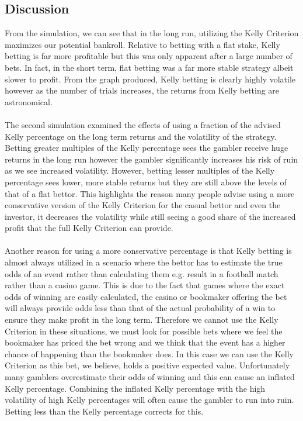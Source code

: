 \documentclass[12pt]{article}
\begin{document}
\subsection{Discussion}
From the simulation, we can see that in the long run, utilizing the Kelly Criterion maximizes our potential bankroll. Relative to betting with a flat stake, Kelly betting is far more profitable but this was only apparent after a large number of bets. In fact, in the short term, flat betting was a far more stable strategy albeit slower to profit. From the graph produced, Kelly betting is clearly highly volatile however as the number of trials increases, the returns from Kelly betting are astronomical.
\\\\
The second simulation examined the effects of using a fraction of the advised Kelly percentage on the long term returns and the volatility of the strategy. Betting greater multiples of the Kelly percentage sees the gambler receive huge returns in the long run however the gambler significantly increases his risk of ruin as we see increased volatility. However, betting lesser multiples of the Kelly percentage sees lower, more stable returns but they are still above the levels of that of a flat bettor. This highlights the reason many people advise using a more conservative version of the Kelly Criterion for the casual bettor and even the investor, it decreases the volatility while still seeing a good share of the increased profit that the full Kelly Criterion can provide.
\\\\
Another reason for using a more conservative percentage is that Kelly betting is almost always utilized in a scenario where the bettor has to estimate the true odds of an event rather than calculating them e.g. result in a football match rather than a casino game. This is due to the fact that games where the exact odds of winning are easily calculated, the casino or bookmaker offering the bet will always provide odds less than that of the actual probability of a win to ensure they make profit in the long term. Therefore we cannot use the Kelly Criterion in these situations, we must look for possible bets where we feel the bookmaker has priced the bet wrong and we think that the event has a higher chance of happening than the bookmaker does. In this case we can use the Kelly Criterion as this bet, we believe, holds a positive expected value. Unfortunately many gamblers overestimate their odds of winning and this can cause an inflated Kelly percentage. Combining the inflated Kelly percentage with the high volatility of high Kelly percentages will often cause the gambler to run into ruin. Betting less than the Kelly percentage corrects for this.
\end{document}
